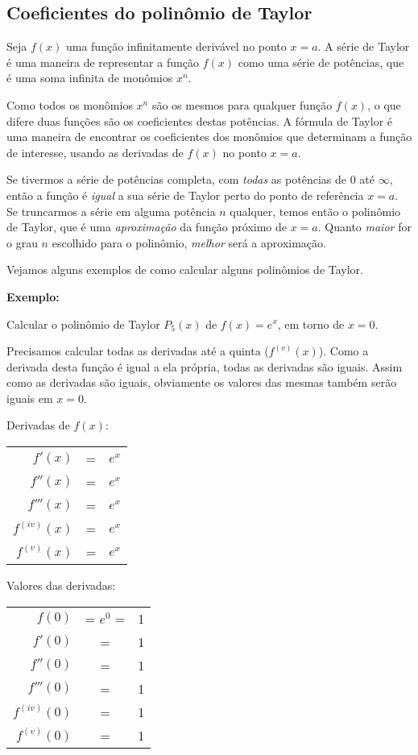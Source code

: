 \documentclass[a4paper]{article}
\begin{document}
\subsection{Coeficientes do polinômio de Taylor}

Seja $f(x)$ uma função infinitamente derivável no ponto $x=a$.
A série de Taylor é uma maneira de representar a função $f(x)$ como uma série de potências, que é uma soma infinita de monômios $x^n$.

Como todos os monômios $x^n$ são os mesmos para qualquer função $f(x)$, o que difere duas funções são os coeficientes destas potências.
A fórmula de Taylor é uma maneira de encontrar os coeficientes dos monômios que determinam a função de interesse, usando as derivadas de $f(x)$ no ponto $x=a$.

Se tivermos a série de potências completa, com {\em todas} as potências de $0$ até $\infty$, então a função é {\em igual} a sua série de Taylor perto do ponto de referência $x=a$.
Se truncarmos a série em alguma potência $n$ qualquer, temos então o polinômio de Taylor, que é uma {\em aproximação} da função próximo de $x=a$.
Quanto {\em maior} for o grau $n$ escolhido para o polinômio, {\em melhor} será a aproximação.

Vejamos alguns exemplos de como calcular alguns polinômios de Taylor.

\hrulefill

{\bf Exemplo:}

Calcular o polinômio de Taylor $P_5(x)$ de $f(x)=e^x$, em torno de $x=0$.

Precisamos calcular todas as derivadas até a quinta ($f^{(v)}(x)$).
Como a derivada desta função é igual a ela própria, todas as derivadas são iguais. Assim como as derivadas são iguais, obviamente os valores das mesmas também serão iguais em $x=0$.

\begin{multicols}{2}

Derivadas de $f(x)$:

  \begin{tabular}{rcl}
    $f'(x)$ &=& $e^x$\\
    $f''(x)$ &=& $e^x$\\
    $f'''(x)$ &=& $e^x$\\
    $f^{(iv)}(x)$ &=& $e^x$\\
    $f^{(v)}(x)$ &=& $e^x$\\
  \end{tabular}

  \columnbreak

Valores das derivadas:

  \begin{tabular}{rcl}
    $f(0)$ &= $e^0$ =& 1\\
    $f'(0)$ &=& 1\\
    $f''(0)$ &=& 1\\
    $f'''(0)$ &=& 1\\
    $f^{(iv)}(0)$ &=& 1\\
    $f^{(v)}(0)$ &=& 1\\
  \end{tabular}
\end{multicols}
\end{document}
